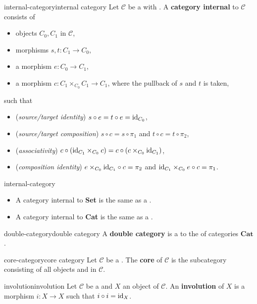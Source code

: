 \begin{topic}{internal-category}{internal category}
    Let $\mathcal{C}$ be a  with . A \textbf{category internal} to $\mathcal{C}$ consists of
    \begin{itemize}
        \item objects $C_0, C_1$ in $\mathcal{C}$,
        \item morphisms $s, t : C_1 \to C_0$,
        \item a morphism $e : C_0 \to C_1$,
        \item a morphism $c : C_1 \times_{C_0} C_1 \to C_1$, where the pullback of $s$ and $t$ is taken,
    \end{itemize}
    such that
    \begin{itemize}
        \item (\textit{source/target identity}) $s \circ e = t \circ e = \textup{id}_{C_0}$,
        \item (\textit{source/target composition}) $s \circ c = s \circ \pi_1$ and $t \circ c = t \circ \pi_2$,
        \item (\textit{associativity}) $c \circ (\textup{id}_{C_1} \times_{C_0} c) = c \circ (c \times_{C_0} \textup{id}_{C_1})$,
        \item (\textit{composition identity}) $e \times_{C_0} \textup{id}_{C_1} \circ c = \pi_2$ and $\textup{id}_{C_1} \times_{C_0} e \circ c = \pi_1$.
    \end{itemize}
\end{topic}

\begin{example}{internal-category}
    \begin{itemize}
        \item A category internal to \textbf{Set} is the same as a .
        \item A category internal to \textbf{Cat} is the same as a .
    \end{itemize}
\end{example}

\begin{topic}{double-category}{double category}
    A \textbf{double category} is a  to the  of categories  $\textbf{Cat}$.
\end{topic}

\begin{topic}{core-category}{core category}
    Let $\mathcal{C}$ be a . The \textbf{core} of $\mathcal{C}$ is the subcategory consisting of all objects and  in $\mathcal{C}$. 
\end{topic}

\begin{topic}{involution}{involution}
    Let $\mathcal{C}$ be a  and $X$ an object of $\mathcal{C}$. An \textbf{involution} of $X$ is a morphism $i : X \to X$ such that $i \circ i = \textup{id}_X$.
\end{topic}
